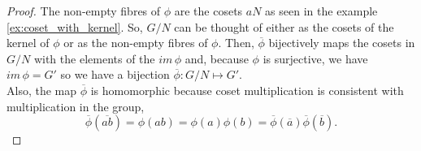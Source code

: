 \documentclass[MathsNotesBase.tex]{subfiles}
\begin{document}
{		
		\begin{proof}
			The non-empty fibres of $\phi$ are the cosets $aN$ as seen in the example \ref{ex:coset_with_kernel}. So, $G/N$ can be thought of either as the cosets of the kernel of $\phi$ or as the non-empty fibres of $\phi$. Then, $\overline\phi$ bijectively maps the cosets in $G/N$ with the elements of the ${ im\,\phi }$ and, because $\phi$ is surjective, we have ${ im\,\phi = G' }$ so we have a bijection ${ \overline\phi: G/N \longmapsto G' }$.\\
			Also, the map $\overline\phi$ is homomorphic because coset multiplication is consistent with multiplication in the group,
			\[ \overline\phi(\overline{ab}) = \phi(ab) = \phi(a)\phi(b) = \overline\phi(\overline{a})\overline\phi(\overline{b}). \]
		\end{proof}
	
}
\end{document}
